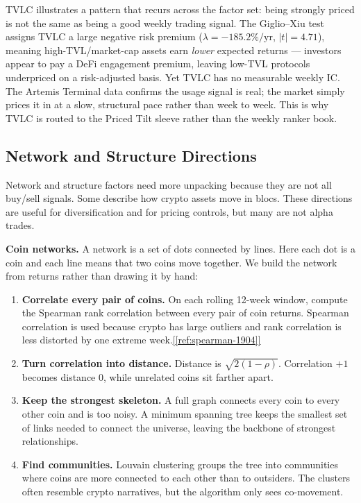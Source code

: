 \documentclass[11pt,a4paper]{article}
\newcommand{\ieeecite}[1]{\hyperref[ref:#1]{[\ref*{ref:#1}]}}
\begin{document}
TVLC illustrates a pattern that recurs across the factor set: being strongly priced is not the same as being a good weekly trading signal. The Giglio--Xiu test assigns TVLC a large negative risk premium ($\lambda = -185.2\%/\text{yr}$, $|t| = 4.71$), meaning high-TVL/market-cap assets earn \emph{lower} expected returns — investors appear to pay a DeFi engagement premium, leaving low-TVL protocols underpriced on a risk-adjusted basis. Yet TVLC has no measurable weekly IC. The Artemis Terminal data confirms the usage signal is real; the market simply prices it in at a slow, structural pace rather than week to week. This is why TVLC is routed to the Priced Tilt sleeve rather than the weekly ranker book.

\subsection{Network and Structure Directions}

Network and structure factors need more unpacking because they are not all buy/sell signals. Some describe how crypto assets move in blocs. These directions are useful for diversification and for pricing controls, but many are not alpha trades.

\textbf{Coin networks.} A network is a set of dots connected by lines. Here each dot is a coin and each line means that two coins move together. We build the network from returns rather than drawing it by hand:

\begin{enumerate}[nosep]
  \item \textbf{Correlate every pair of coins.} On each rolling 12-week window, compute the Spearman rank correlation between every pair of coin returns. Spearman correlation is used because crypto has large outliers and rank correlation is less distorted by one extreme week.\ieeecite{spearman-1904}
  \item \textbf{Turn correlation into distance.} Distance is $\sqrt{2(1-\rho)}$. Correlation $+1$ becomes distance 0, while unrelated coins sit farther apart.
  \item \textbf{Keep the strongest skeleton.} A full graph connects every coin to every other coin and is too noisy. A minimum spanning tree keeps the smallest set of links needed to connect the universe, leaving the backbone of strongest relationships.
  \item \textbf{Find communities.} Louvain clustering groups the tree into communities where coins are more connected to each other than to outsiders. The clusters often resemble crypto narratives, but the algorithm only sees co-movement.
\end{enumerate}
\end{document}
